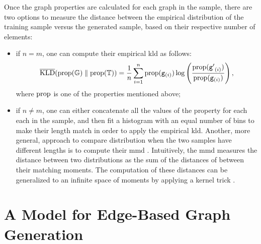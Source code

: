 Once the graph properties are calculated for each graph in the sample, there are two options to measure the distance between the empirical distribution of the training sample versus the generated sample, based on their respective number of elements:
\begin{itemize}
    \item if $n = m$, one can compute their empirical \gls{kld} as follows:
    $$\overline{\mathrm{KLD}}(\mathrm{prop}(\mathbb{G}) \;\Vert\; \mathrm{prop}(\mathbb{T})) = \frac{1}{n} \sum_{i=1}^{n} \mathrm{prop}(\mathtt{g}_{(i)}) \log \left( \frac{\mathrm{prop}(\mathtt{g'}_{(i)})}{\mathrm{prop}(\mathtt{g}_{(i)})} \right),$$
    where $\mathrm{prop}$ is one of the properties mentioned above;
    \item if $n \neq m$, one can either concatenate all the values of the property for each each in the sample, and then fit a histogram with an equal number of bins to make their length match in order to apply the empirical \gls{kld}. Another, more general, approach to compare distribution when the two samples have different lengths is to compute their \gls{mmd} \citep{gretton2012mmdkernel}. Intuitively, the \gls{mmd} measures the distance between two distributions as the sum of the distances of between their matching moments. The computation of these distances can be generalized to an infinite space of moments by applying a kernel trick \citep{smola2008kernels}.
\end{itemize}

\section{A Model for Edge-Based Graph Generation}
